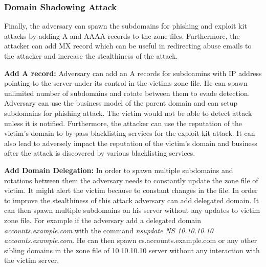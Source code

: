 

\subsubsection{Domain Shadowing Attack}

Finally, the adversary can spawn the subdomains for phishing and exploit kit attacks by adding A and AAAA records to the zone files. Furthermore, the attacker can add MX record which can be useful in redirecting abuse emails to the attacker and increase the stealthiness of the attack. 

\textbf{Add A record:} 
Adversary can add an A records for subdoamins with IP address pointing to the server under its control in the victims zone file. He can spawn unlimited number of subdomains and rotate between them to evade detection. Adversary can use the business model of the parent domain and can setup subdomains for phishing attack. The victim would not be able to detect attack unless it is notified. Furthermore, the attacker can use the reputation of the victim's domain to by-pass blacklisting services for the exploit kit attack. It can also lead to adversely impact the reputation of the victim's domain and business after the attack is discovered by various blacklisting services.

\textbf{Add Domain Delegation:}
In order to spawn multiple subdomains and rotations between them the adversary needs to constantly update the zone file of victim. It might alert the victim because to constant changes in the file. In order to improve the stealthiness of this attack adversary can add delegated domain. It can then spawn multiple subdomains on his server without any updates to victim zone file. For example if the adversary add a delegated domain
\textit{accounts.example.com} with the command %
\textit{nsupdate NS 10.10.10.10 accounts.example.com}. He can then spawn cs.accounts.example.com or any other sibling domains in the zone file of 10.10.10.10 server without any interaction with the victim server. 




